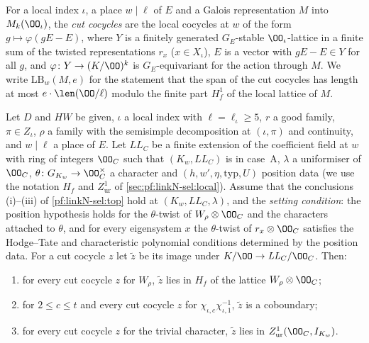 For a local index $\iota$, a place $w\mid\ell$ of $E$ and a Galois representation $M$ into $M_k(\OO_\iota)$, the \emph{cut cocycles} are the local
cocycles at $w$ of the form $g\mapsto\varphi(gE-E)$, where $Y$ is a finitely generated $G_E$-stable $\OO_\iota$-lattice in a finite sum of the
twisted representations $r_x$ ($x\in X_\iota$), $E$ is a vector with $gE-E\in Y$ for all $g$, and $\varphi\colon Y\to(K/\OO)^k$ is
$G_E$-equivariant for the action through $M$. We write $\mathrm{LB}_w(M,e)$ for the statement that the span of the cut cocycles has length at most
$e\cdot\len(\OO/\ell)$ modulo the finite part $H^1_f$ of the local lattice of $M$.

\begin{lemma}\label{pf:linkN-sel:enlarge}
Let $D$ and $HW$ be given, $\iota$ a local index with $\ell=\ell_\iota\ge5$, $r$ a good family, $\pi\in Z_\iota$, $\rho$ a family with the
semisimple decomposition at $(\iota,\pi)$ and continuity, and $w\mid\ell$ a place of $E$. Let $\mathit{LL}_C$ be a finite extension of the
coefficient field at $w$ with ring of integers $\OO_C$ such that $(K_w,\mathit{LL}_C)$ is in case~A, $\lambda$ a uniformiser of $\OO_C$,
$\theta\colon G_{K_w}\to\OO_C^\times$ a character and $(h,w',\eta,\mathrm{typ},U)$ position data (we use the notation $H_f$ and $Z^1_{\mathrm{ur}}$ of
\cref{sec:pf:linkN-sel:local}). Assume that the conclusions (i)--(iii) of
\cref{pf:linkN-sel:top} hold at $(K_w,\mathit{LL}_C,\lambda)$, and the \emph{setting condition}: the position hypothesis holds for the
$\theta$-twist of $W_\rho\otimes\OO_C$ and the characters attached to $\theta$, and for every eigensystem $x$ the $\theta$-twist of
$r_x\otimes\OO_C$ satisfies the Hodge--Tate and characteristic polynomial conditions determined by the position data. For a cut cocycle $z$ let
$\tilde z$ be its image under $K/\OO\to\mathit{LL}_C/\OO_C$. Then:
\begin{enumerate}[label=(\alph*)]
\item for every cut cocycle $z$ for $W_\rho$, $\tilde z$ lies in $H_f$ of the lattice $W_\rho\otimes\OO_C$;
\item for $2\le c\le t$ and every cut cocycle $z$ for $\chi_{\iota,c}\chi_{\iota,1}^{-1}$, $\tilde z$ is a coboundary;
\item for every cut cocycle $z$ for the trivial character, $\tilde z$ lies in $Z^1_{\mathrm{ur}}(\OO_C,I_{K_w})$.
\end{enumerate}
\end{lemma}

